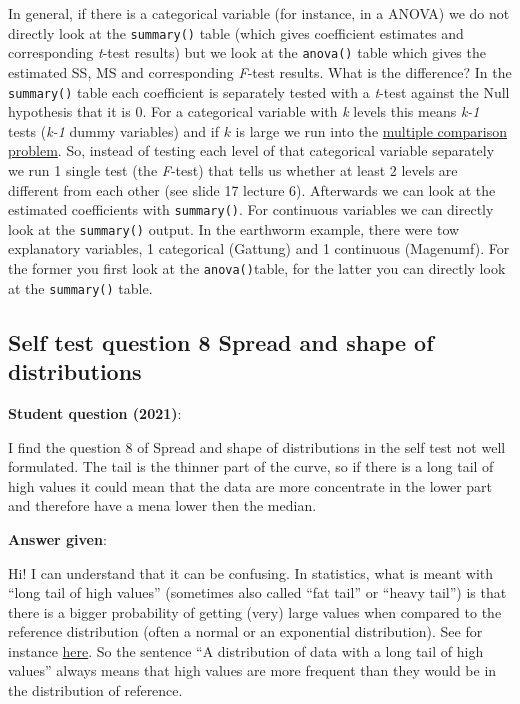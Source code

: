 \documentclass[
  letterpaper,
  8pt,
  a4paper]{book}
\begin{document}
In general, if there is a categorical variable (for instance, in a
ANOVA) we do not directly look at the \texttt{summary()} table (which
gives coefficient estimates and corresponding \emph{t}-test results) but
we look at the \texttt{anova()} table which gives the estimated SS, MS
and corresponding \emph{F}-test results. What is the difference? In the
\texttt{summary()} table each coefficient is separately tested with a
\emph{t}-test against the Null hypothesis that it is 0. For a
categorical variable with \emph{k} levels this means \emph{k-1} tests
(\emph{k-1} dummy variables) and if \(k\) is large we run into the
\href{https://en.wikipedia.org/wiki/Multiple_comparisons_problem}{multiple
comparison problem}. So, instead of testing each level of that
categorical variable separately we run 1 single test (the \emph{F}-test)
that tells us whether at least 2 levels are different from each other
(see slide 17 lecture 6). Afterwards we can look at the estimated
coefficients with \texttt{summary()}. For continuous variables we can
directly look at the \texttt{summary()} output. In the earthworm
example, there were tow explanatory variables, 1 categorical (Gattung)
and 1 continuous (Magenumf). For the former you first look at the
\texttt{anova()}table, for the latter you can directly look at the
\texttt{summary()} table.

\subsection*{Self test question 8 Spread and shape of
distributions}\label{self-test-question-8-spread-and-shape-of-distributions}

\textbf{Student question (2021)}:

I find the question 8 of Spread and shape of distributions in the self
test not well formulated. The tail is the thinner part of the curve, so
if there is a long tail of high values it could mean that the data are
more concentrate in the lower part and therefore have a mena lower then
the median.

\textbf{Answer given}:

Hi! I can understand that it can be confusing. In statistics, what is
meant with ``long tail of high values'' (sometimes also called ``fat
tail'' or ``heavy tail'') is that there is a bigger probability of
getting (very) large values when compared to the reference distribution
(often a normal or an exponential distribution). See for instance
\href{https://en.wikipedia.org/wiki/Fat-tailed_distribution}{here}. So
the sentence ``A distribution of data with a long tail of high values''
always means that high values are more frequent than they would be in
the distribution of reference.
\end{document}
